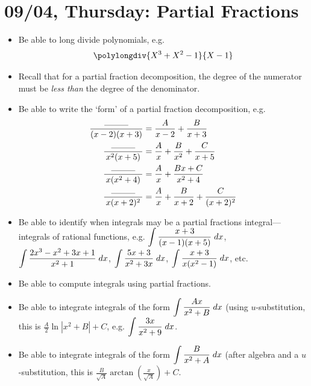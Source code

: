 \documentclass[11pt,letterpaper]{article}
\begin{document}
\newpage
\section*{09/04, Thursday: Partial Fractions\label{09-04}}

\begin{itemize}
\item Be able to long divide polynomials, e.g.
	\[
	\polylongdiv{X^3+X^2-1}{X-1}
	\]

\item Recall that for a partial fraction decomposition, the degree of the numerator must be \textit{less than} the degree of the denominator.

\item Be able to write the `form' of a partial fraction decomposition, e.g.
	\[
	\begin{aligned}
	\dfrac{\;\;\;\rule{1cm}{0.3pt}\;\;\;}{(x - 2)(x + 3)}&= \dfrac{A}{x - 2} + \dfrac{B}{x + 3} \\
	\dfrac{\;\;\;\rule{1cm}{0.3pt}\;\;\;}{x^2(x + 5)}&= \dfrac{A}{x} + \dfrac{B}{x^2} + \dfrac{C}{x + 5} \\
	\dfrac{\;\;\;\rule{1cm}{0.3pt}\;\;\;}{x(x^2 + 4)}&= \dfrac{A}{x} + \dfrac{Bx + C}{x^2 + 4} \\
	\dfrac{\;\;\;\rule{1cm}{0.3pt}\;\;\;}{x(x + 2)^2}&= \dfrac{A}{x} + \dfrac{B}{x + 2} + \dfrac{C}{(x + 2)^2}
	\end{aligned}
	\]

\item Be able to identify when integrals may be a partial fractions integral---integrals of rational functions, e.g. $\displaystyle\int \dfrac{x + 3}{(x - 1)(x + 5)} \;dx$, $\displaystyle\int \dfrac{2x^3 - x^2 + 3x + 1}{x^2 + 1} \;dx$, $\displaystyle\int \dfrac{5x + 3}{x^2 + 3x} \;dx$, $\displaystyle\int \dfrac{x + 3}{x(x^2 - 1)} \;dx$, etc. 

\item Be able to compute integrals using partial fractions. 

\item Be able to integrate integrals of the form $\displaystyle\int \dfrac{Ax}{x^2 + B} \;dx$ (using $u$-substitution, this is $\tfrac{A}{2} \ln|x^2 + B| + C$, e.g. $\displaystyle\int \dfrac{3x}{x^2 + 9} \;dx$.

\item Be able to integrate integrals of the form $\displaystyle\int \dfrac{B}{x^2 + A} \;dx$ (after algebra and a $u$-substitution, this is $\tfrac{B}{\sqrt{A}} \arctan\left( \tfrac{x}{\sqrt{A}} \right) + C$.
\end{itemize}
\end{document}

